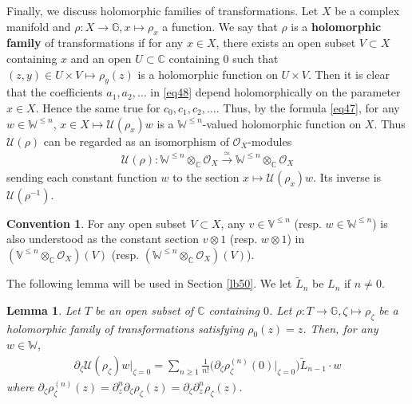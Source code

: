 \documentclass[12pt,b5paper,notitlepage]{report}
\theoremstyle{definition}
\newtheorem{cv}[df]{Convention}
\theoremstyle{plain}
\newtheorem{lm}[df]{Lemma}
\newcommand{\mc}{\mathcal}
\newcommand{\wtd}{\widetilde}
\newcommand{\scr}{\mathscr}
\newcommand{\mbb}{\mathbb}
\newcommand{\blt}{\bullet}
\newcommand{\Vbb}{\mathbb V}
\newcommand{\Wbb}{\mathbb W}
\newcommand{\Gbb}{\mathbb G}
\newcommand{\Cbb}{\mathbb C}
\numberwithin{equation}{section}
\begin{document}
Finally, we discuss holomorphic families of transformations. Let $X$ be a complex manifold and $\rho:X\rightarrow\mbb G,x\mapsto \rho_x$ a function. We say that $\rho$ is a \textbf{holomorphic family} of transformations if for any $x\in X$, there exists an open subset $V\subset X$ containing $x$ and an open $U\subset\Cbb$ containing $0$ such that  $(z,y)\in U\times V\mapsto \rho_y(z)$ is a holomorphic function on $U\times V$. Then it is clear that the coefficients $a_1,a_2,\dots$ in \eqref{eq48} depend holomorphically on the parameter $x\in X$. Hence the same true for $c_0,c_1,c_2,\dots$. Thus, by the formula \eqref{eq47}, for any $w\in\Wbb^{\leq n}$, $x\in X\mapsto \mc U(\rho_x)w$ is a $\Wbb^{\leq n}$-valued holomorphic function on $X$. Thus $\mc U(\rho)$ can be regarded as an isomorphism of  $\scr O_X$-modules 
\begin{align}
\mc U(\rho): \Wbb^{\leq n}\otimes_{\Cbb}\scr O_X\xrightarrow{\simeq}\Wbb^{\leq n}\otimes_{\Cbb}\scr O_X\label{eq64}
\end{align}
sending each constant function $w$ to the section $x\mapsto \mc U(\rho_x)w$. \index{U@$\mc U(\rho),\mc U(\eta_\blt)$} Its inverse is  $\mc U(\rho^{-1})$.



\begin{cv}
For any open subset $V\subset X$, any $v\in\Vbb^{\leq n}$  (resp. $w\in\Wbb^{\leq n}$) is also understood as the constant section $v\otimes 1$ (resp. $w\otimes 1$) in $(\Vbb^{\leq n}\otimes_{\Cbb}\scr O_X)(V)$ (resp. $(\Wbb^{\leq n}\otimes_{\Cbb}\scr O_X)(V)$).
\end{cv}




The following lemma will be used in Section \ref{lb50}. We let $\wtd L_n$ be $L_n$ if $n\neq 0$. \index{L0Ln@$\wtd L_0,\wtd L_n$}

\begin{lm}\label{lb29}
Let $T$ be an open subset of $\Cbb$ containing $0$. Let $\rho:T\rightarrow\Gbb,\zeta\mapsto\rho_\zeta$ be a holomorphic family of transformations satisfying $\rho_0(z)=z$. Then, for any $w\in\Wbb$, 
\begin{align}
\partial_\zeta\mc U(\rho_\zeta)w\Big|_{\zeta=0}=\sum_{n\geq 1}\frac 1{n!}\Big(\partial_\zeta\rho_\zeta^{(n)}(0)\Big|_{\zeta=0}\Big)\wtd L_{n-1}\cdot w\label{eq82}
\end{align}
where $\partial_\zeta\rho_\zeta^{(n)}(z)=\partial_z^n\partial_\zeta\rho_\zeta(z)=\partial_\zeta\partial_z^n\rho_\zeta(z)$.
\end{lm}
\end{document}
